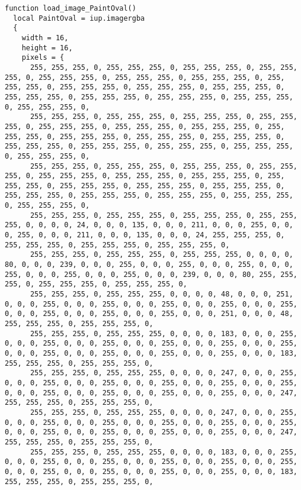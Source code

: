 \documentclass{ctexart}
\begin{document}
\begin{lstlisting}
function load_image_PaintOval()
  local PaintOval = iup.imagergba
  {
    width = 16,
    height = 16,
    pixels = {
      255, 255, 255, 0, 255, 255, 255, 0, 255, 255, 255, 0, 255, 255, 255, 0, 255, 255, 255, 0, 255, 255, 255, 0, 255, 255, 255, 0, 255, 255, 255, 0, 255, 255, 255, 0, 255, 255, 255, 0, 255, 255, 255, 0, 255, 255, 255, 0, 255, 255, 255, 0, 255, 255, 255, 0, 255, 255, 255, 0, 255, 255, 255, 0, 
      255, 255, 255, 0, 255, 255, 255, 0, 255, 255, 255, 0, 255, 255, 255, 0, 255, 255, 255, 0, 255, 255, 255, 0, 255, 255, 255, 0, 255, 255, 255, 0, 255, 255, 255, 0, 255, 255, 255, 0, 255, 255, 255, 0, 255, 255, 255, 0, 255, 255, 255, 0, 255, 255, 255, 0, 255, 255, 255, 0, 255, 255, 255, 0, 
      255, 255, 255, 0, 255, 255, 255, 0, 255, 255, 255, 0, 255, 255, 255, 0, 255, 255, 255, 0, 255, 255, 255, 0, 255, 255, 255, 0, 255, 255, 255, 0, 255, 255, 255, 0, 255, 255, 255, 0, 255, 255, 255, 0, 255, 255, 255, 0, 255, 255, 255, 0, 255, 255, 255, 0, 255, 255, 255, 0, 255, 255, 255, 0, 
      255, 255, 255, 0, 255, 255, 255, 0, 255, 255, 255, 0, 255, 255, 255, 0, 0, 0, 0, 24, 0, 0, 0, 135, 0, 0, 0, 211, 0, 0, 0, 255, 0, 0, 0, 255, 0, 0, 0, 211, 0, 0, 0, 135, 0, 0, 0, 24, 255, 255, 255, 0, 255, 255, 255, 0, 255, 255, 255, 0, 255, 255, 255, 0, 
      255, 255, 255, 0, 255, 255, 255, 0, 255, 255, 255, 0, 0, 0, 0, 80, 0, 0, 0, 239, 0, 0, 0, 255, 0, 0, 0, 255, 0, 0, 0, 255, 0, 0, 0, 255, 0, 0, 0, 255, 0, 0, 0, 255, 0, 0, 0, 239, 0, 0, 0, 80, 255, 255, 255, 0, 255, 255, 255, 0, 255, 255, 255, 0, 
      255, 255, 255, 0, 255, 255, 255, 0, 0, 0, 0, 48, 0, 0, 0, 251, 0, 0, 0, 255, 0, 0, 0, 255, 0, 0, 0, 255, 0, 0, 0, 255, 0, 0, 0, 255, 0, 0, 0, 255, 0, 0, 0, 255, 0, 0, 0, 255, 0, 0, 0, 251, 0, 0, 0, 48, 255, 255, 255, 0, 255, 255, 255, 0, 
      255, 255, 255, 0, 255, 255, 255, 0, 0, 0, 0, 183, 0, 0, 0, 255, 0, 0, 0, 255, 0, 0, 0, 255, 0, 0, 0, 255, 0, 0, 0, 255, 0, 0, 0, 255, 0, 0, 0, 255, 0, 0, 0, 255, 0, 0, 0, 255, 0, 0, 0, 255, 0, 0, 0, 183, 255, 255, 255, 0, 255, 255, 255, 0, 
      255, 255, 255, 0, 255, 255, 255, 0, 0, 0, 0, 247, 0, 0, 0, 255, 0, 0, 0, 255, 0, 0, 0, 255, 0, 0, 0, 255, 0, 0, 0, 255, 0, 0, 0, 255, 0, 0, 0, 255, 0, 0, 0, 255, 0, 0, 0, 255, 0, 0, 0, 255, 0, 0, 0, 247, 255, 255, 255, 0, 255, 255, 255, 0, 
      255, 255, 255, 0, 255, 255, 255, 0, 0, 0, 0, 247, 0, 0, 0, 255, 0, 0, 0, 255, 0, 0, 0, 255, 0, 0, 0, 255, 0, 0, 0, 255, 0, 0, 0, 255, 0, 0, 0, 255, 0, 0, 0, 255, 0, 0, 0, 255, 0, 0, 0, 255, 0, 0, 0, 247, 255, 255, 255, 0, 255, 255, 255, 0, 
      255, 255, 255, 0, 255, 255, 255, 0, 0, 0, 0, 183, 0, 0, 0, 255, 0, 0, 0, 255, 0, 0, 0, 255, 0, 0, 0, 255, 0, 0, 0, 255, 0, 0, 0, 255, 0, 0, 0, 255, 0, 0, 0, 255, 0, 0, 0, 255, 0, 0, 0, 255, 0, 0, 0, 183, 255, 255, 255, 0, 255, 255, 255, 0, 

\end{lstlisting}
\end{document}
